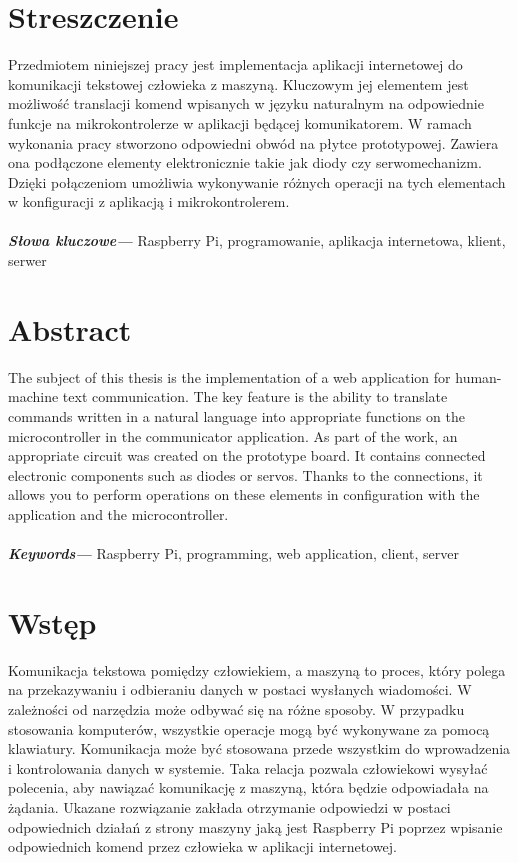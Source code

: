 \providecommand{\keywords}[1]
{
  \small	
  \textbf{\textit{Keywords---}} #1
}

\providecommand{\Slowakluczowe}[1]
{
  \small	
  \textbf{\textit{Słowa kluczowe---}} #1
}



\section{Streszczenie}
Przedmiotem niniejszej pracy jest implementacja aplikacji internetowej do komunikacji tekstowej człowieka z maszyną. Kluczowym jej elementem jest możliwość translacji komend wpisanych w języku naturalnym na odpowiednie funkcje na mikrokontrolerze w aplikacji będącej komunikatorem. W ramach wykonania pracy stworzono odpowiedni obwód na płytce prototypowej. Zawiera ona podłączone elementy elektronicznie takie jak diody czy serwomechanizm. Dzięki połączeniom umożliwia wykonywanie różnych operacji na tych elementach w konfiguracji z aplikacją i mikrokontrolerem.
\\
\\
\Slowakluczowe{Raspberry Pi, programowanie, aplikacja internetowa, klient, serwer}

\section{Abstract}
The subject of this thesis is the implementation of a web application for human-machine text communication. The key feature is the ability to translate commands written in a natural language into appropriate functions on the microcontroller in the communicator application. As part of the work, an appropriate circuit was created on the prototype board. It contains connected electronic components such as diodes or servos. Thanks to the connections, it allows you to perform operations on these elements in configuration with the application and the microcontroller.
\\
\\
\keywords{Raspberry Pi, programming, web application, client, server}
\section{Wstęp}
Komunikacja tekstowa pomiędzy człowiekiem, a maszyną to proces, który polega na przekazywaniu i odbieraniu danych w postaci wysłanych wiadomości. W zależności od narzędzia może odbywać się na różne sposoby. W przypadku stosowania komputerów, wszystkie operacje mogą być wykonywane za pomocą klawiatury. Komunikacja może być stosowana przede wszystkim do wprowadzenia i kontrolowania danych w systemie. Taka relacja pozwala człowiekowi wysyłać polecenia, aby nawiązać komunikację z maszyną, która będzie odpowiadała na żądania. Ukazane rozwiązanie zakłada otrzymanie odpowiedzi w postaci odpowiednich działań z strony maszyny jaką jest Raspberry Pi poprzez wpisanie odpowiednich komend przez człowieka w aplikacji internetowej.


